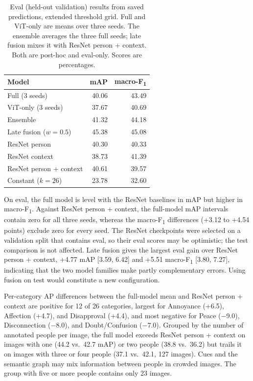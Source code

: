 \documentclass[conference]{IEEEtran}
\newcommand{\mf}{macro-F\textsubscript{1}}
\newcommand{\tablegap}{\setlength{\tabcolsep}{4pt}}
\begin{document}
\begin{table}[t]
\centering
\caption{Eval (held-out validation) results from saved predictions, extended threshold grid. Full and ViT-only are means over three seeds. The ensemble averages the three full seeds; late fusion mixes it with ResNet person + context. Both are post-hoc and eval-only. Scores are percentages.}
\label{tab:eval}
\small
\tablegap
\begin{tabular}{lrr}
\toprule
Model & mAP & \mf{} \\
\midrule
Full (3 seeds) & 40.06 & 43.49 \\
ViT-only (3 seeds) & 37.67 & 40.69 \\
Ensemble & 41.32 & 44.18 \\
Late fusion ($w=0.5$) & 45.38 & 45.08 \\
\midrule
ResNet person & 40.30 & 40.33 \\
ResNet context & 38.73 & 41.39 \\
ResNet person + context & 40.61 & 39.57 \\
Constant ($k=26$) & 23.78 & 32.60 \\
\bottomrule
\end{tabular}
\end{table}

On eval, the full model is level with the ResNet baselines in mAP but higher in \mf{}. Against ResNet person + context, the full-model mAP intervals contain zero for all three seeds, whereas the \mf{} differences (+3.12 to +4.54 points) exclude zero for every seed. The ResNet checkpoints were selected on a validation split that contains eval, so their eval scores may be optimistic; the test comparison is not affected. Late fusion gives the largest eval gain over ResNet person + context, +4.77 mAP [3.59, 6.42] and +5.51 \mf{} [3.80, 7.27], indicating that the two model families make partly complementary errors. Using fusion on test would constitute a new configuration.

Per-category AP differences between the full-model mean and ResNet person + context are positive for 12 of 26 categories, largest for Annoyance (+6.5), Affection (+4.7), and Disapproval (+4.4), and most negative for Peace ($-$9.0), Disconnection ($-$8.0), and Doubt/Confusion ($-$7.0). Grouped by the number of annotated people per image, the full model exceeds ResNet person + context on images with one (44.2 vs.\ 42.7 mAP) or two people (38.8 vs.\ 36.2) but trails it on images with three or four people (37.1 vs.\ 42.1, 127 images). Cues and the semantic graph may mix information between people in crowded images. The group with five or more people contains only 23 images.
\end{document}

